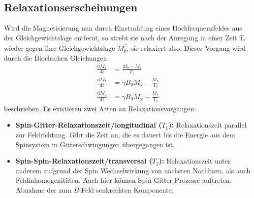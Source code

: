 \subsection{Relaxationserscheinungen}
Wird die Magnetisierung nun durch Einstrahlung eines Hochfrequenzfeldes
aus der Gleichgewichtslage entfernt, so strebt sie nach der Anregung in einer Zeit $T_{i}$
wieder gegen ihre Gleichgewichtslage $\vec{M_{0}}$, sie relaxiert also.
Dieser Vorgang wird durch die Blochschen Gleichungen
\begin{align}
		\frac{\text{d} M_\text{z}}{\text{d} t} &= \frac{M_0 - M_\text{z}}{T_1} \\
		\frac{\text{d} M_\text{x}}{\text{d} t} &= \gamma B_0 M_\text{y} -
		\frac{M_\text{x}}{T_2} \\
		\frac{\text{d} M_\text{y}}{\text{d} t} &= \gamma B_0 M_\text{x} - \frac{M_\text{y}}{T_2}
\end{align}
beschrieben.
Es existieren zwei Arten an Relaxationsvorgängen:
\begin{itemize}
		\item \textbf{Spin-Gitter-Relaxationszeit/longitudinal ($T_{1}$):}
				Relaxationszeit parallel zur Feldrichtung. Gibt die Zeit
				an, die es dauert bis die Energie aus dem Spinsystem in Gitterschwingungen
				übergegangen ist.
		\item \textbf{Spin-Spin-Relaxationszeit/transversal ($T_{2}$):} Relaxationszeit
				unter anderem aufgrund der Spin Wechselwirkung von nächsten
				Nachbarn, als auch Feldinhomogenitäten. Auch hier können Spin-Gitter-Prozesse
        auftreten. Abnahme der zum $B$-Feld senkrechten Komponente.
\end{itemize}

